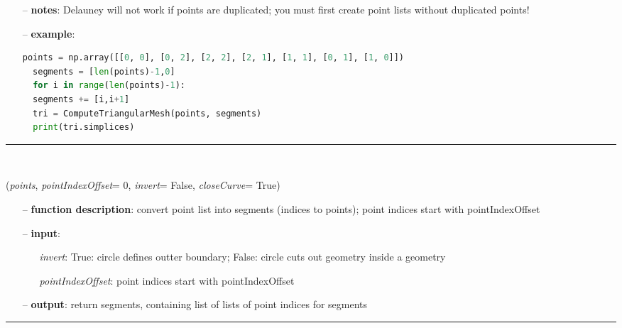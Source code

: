 \begin{itemize}[leftmargin=1.4cm]
\begin{itemize}[leftmargin=1.4cm]
\begin{itemize}[leftmargin=0.5cm]
\begin{itemize}[leftmargin=1.4cm]
\begin{itemize}[leftmargin=1.4cm]
\begin{itemize}[leftmargin=0.5cm]
\begin{itemize}[leftmargin=1.4cm]
\begin{itemize}[leftmargin=0.5cm]
\begin{itemize}[leftmargin=0.7cm]
\item[--]{\bf notes}: Delauney will not work if points are duplicated; you must first create point lists without duplicated points!
\item[--]{\bf example}: \vspace{-12pt}\ei\begin{lstlisting}[language=Python, xleftmargin=36pt]
  points = np.array([[0, 0], [0, 2], [2, 2], [2, 1], [1, 1], [0, 1], [1, 0]])
  segments = [len(points)-1,0]
  for i in range(len(points)-1):
  segments += [i,i+1]
  tri = ComputeTriangularMesh(points, segments)
  print(tri.simplices)\end{lstlisting}\vspace{-24pt}\bi\item[]\vspace{-24pt}\vspace{12pt}\end{itemize}
%
\noindent\rule{8cm}{0.75pt}\vspace{1pt} \\ 
\begin{flushleft}
\label{sec:graphicsDataUtilities:SegmentsFromPoints}
({\it points}, {\it pointIndexOffset}= 0, {\it invert}= False, {\it closeCurve}= True)
\end{flushleft}
\setlength{\itemindent}{0.7cm}
\begin{itemize}[leftmargin=0.7cm]
\item[--]{\bf function description}: convert point list into segments (indices to points); point indices start with pointIndexOffset
\item[--]{\bf input}: \vspace{-6pt}
\begin{itemize}[leftmargin=1.2cm]
\setlength{\itemindent}{-0.7cm}
\item[]{\it invert}: True: circle defines outter boundary; False: circle cuts out geometry inside a geometry
\item[]{\it pointIndexOffset}: point indices start with pointIndexOffset
\end{itemize}
\item[--]{\bf output}: return segments, containing list of lists of point indices for segments
\vspace{12pt}\end{itemize}
%
\noindent\rule{8cm}{0.75pt}\vspace{1pt} \\ 

\end{itemize}
\end{itemize}
\end{itemize}
\end{itemize}
\end{itemize}
\end{itemize}
\end{itemize}
\end{itemize}
